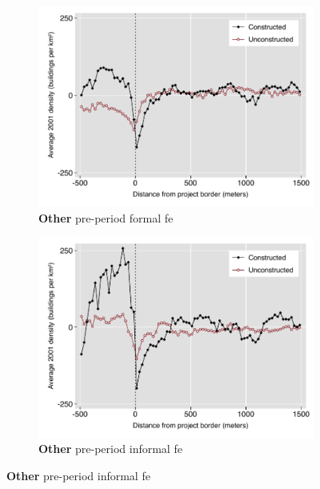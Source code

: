 \documentclass[12pt]{article}
\begin{document}
\begin{figure}
\begin{subfigure}[b]{0.48\textwidth}
        \end{subfigure}
        \begin{subfigure}[b]{0.48\textwidth}
                    \caption[Network2]%
            {{\footnotesize \textbf{Other} pre-period formal fe }}   
            \label{fig:prefor}
            \centering
            \includegraphics[width=\textwidth,trim={0.3cm .3cm 0.1cm 0cm}, clip=true]{figures/bblu_for_fe_pre_pre_means_4_3_spk.pdf}

        \end{subfigure}
        \hfill
        \begin{subfigure}[b]{0.48\textwidth}  
                    \caption[]%
            {{\footnotesize \textbf{Other} pre-period informal fe }}      
            \label{fig:preinf}
            \centering 
            \includegraphics[width=\textwidth,trim={0.3cm .3cm 0.1cm 0cm}, clip=true]{figures/bblu_inf_fe_pre_pre_means_4_3_spk.pdf}

        \end{subfigure}
\end{figure}
\end{document}
